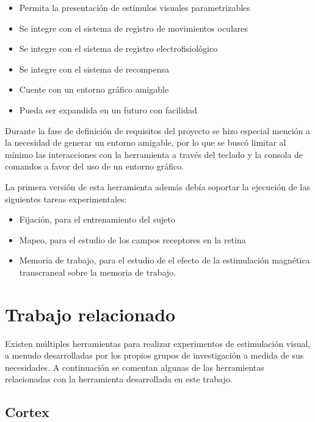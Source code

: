 \documentclass[conference]{IEEEtran}
\begin{document}
\begin{itemize}
	
	\item Permita la presentación de estímulos visuales parametrizables
	\item Se integre con el sistema de registro de movimientos oculares
	\item Se integre con el sistema de registro electrofisiológico
	\item Se integre con el sistema de recompensa
	\item Cuente con un entorno gráfico amigable
	\item Pueda ser expandida en un futuro con facilidad
\end{itemize}


Durante la fase de definición de requisitos del proyecto se hizo especial mención a la necesidad de generar un entorno amigable, por lo que se buscó limitar al mínimo las interacciones con la herramienta a través del teclado y la consola de comandos a favor del uso de un entorno gráfico.

La primera versión de esta herramienta además debía soportar la ejecución de las siguientes tareas experimentales:

\begin{itemize}
	\item Fijación, para el entrenamiento del sujeto
	\item Mapeo, para el estudio de los campos receptores en la retina
	\item Memoria de trabajo, para el estudio de el efecto de la estimulación magnética transcraneal sobre la memoria de trabajo.
\end{itemize}

\section{Trabajo relacionado}

Existen múltiples herramientas para realizar experimentos de estimulación visual, a menudo desarrolladas por los propios grupos de investigación a medida de sus necesidades. A continuación se comentan algunas de las herramientas relacionadas con la herramienta desarrollada en este trabajo.

\subsection{Cortex}
\end{document}
